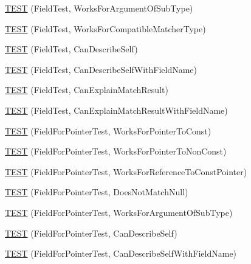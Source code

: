 \begin{DoxyCompactItemize}
\item 
\mbox{\hyperlink{namespacetesting_1_1gmock__matchers__test_ae720452c3587433e26bea2ea7e91f8e6}{T\+E\+ST}} (Field\+Test, Works\+For\+Argument\+Of\+Sub\+Type)
\item 
\mbox{\hyperlink{namespacetesting_1_1gmock__matchers__test_a27058ed7297742f08419bc5feb3ef687}{T\+E\+ST}} (Field\+Test, Works\+For\+Compatible\+Matcher\+Type)
\item 
\mbox{\hyperlink{namespacetesting_1_1gmock__matchers__test_ac43583cb3c4221aa6bd0132c2cb3fed6}{T\+E\+ST}} (Field\+Test, Can\+Describe\+Self)
\item 
\mbox{\hyperlink{namespacetesting_1_1gmock__matchers__test_a37d3ea6fde3a814c788ecddead6b9828}{T\+E\+ST}} (Field\+Test, Can\+Describe\+Self\+With\+Field\+Name)
\item 
\mbox{\hyperlink{namespacetesting_1_1gmock__matchers__test_ae1279ce8e2a3a6c6f0d4dbe436c9da02}{T\+E\+ST}} (Field\+Test, Can\+Explain\+Match\+Result)
\item 
\mbox{\hyperlink{namespacetesting_1_1gmock__matchers__test_aaeb4a7641ecabdb39710c56321000e47}{T\+E\+ST}} (Field\+Test, Can\+Explain\+Match\+Result\+With\+Field\+Name)
\item 
\mbox{\hyperlink{namespacetesting_1_1gmock__matchers__test_af5c12cdd12f8778074ad0714b83858ed}{T\+E\+ST}} (Field\+For\+Pointer\+Test, Works\+For\+Pointer\+To\+Const)
\item 
\mbox{\hyperlink{namespacetesting_1_1gmock__matchers__test_ac339a26bf6100a2eb2dd4bf908f8448c}{T\+E\+ST}} (Field\+For\+Pointer\+Test, Works\+For\+Pointer\+To\+Non\+Const)
\item 
\mbox{\hyperlink{namespacetesting_1_1gmock__matchers__test_a603253edc7a2310c8a1db225cb589a99}{T\+E\+ST}} (Field\+For\+Pointer\+Test, Works\+For\+Reference\+To\+Const\+Pointer)
\item 
\mbox{\hyperlink{namespacetesting_1_1gmock__matchers__test_a06a1c8d949707ab606627e9f6efe87b9}{T\+E\+ST}} (Field\+For\+Pointer\+Test, Does\+Not\+Match\+Null)
\item 
\mbox{\hyperlink{namespacetesting_1_1gmock__matchers__test_a5447541a290e16a81aec6dd975983d57}{T\+E\+ST}} (Field\+For\+Pointer\+Test, Works\+For\+Argument\+Of\+Sub\+Type)
\item 
\mbox{\hyperlink{namespacetesting_1_1gmock__matchers__test_a056670af8fc7bd3dfd170435dbf08c3c}{T\+E\+ST}} (Field\+For\+Pointer\+Test, Can\+Describe\+Self)
\item 
\mbox{\hyperlink{namespacetesting_1_1gmock__matchers__test_ac1ff62c6b02c5267c3437c72f62bc8c7}{T\+E\+ST}} (Field\+For\+Pointer\+Test, Can\+Describe\+Self\+With\+Field\+Name)

\end{DoxyCompactItemize}
